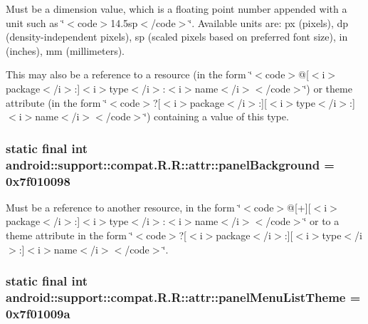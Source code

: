 Must be a dimension value, which is a floating point number appended with a unit such as \char`\"{}$<$code$>$14.5sp$<$/code$>$\char`\"{}. Available units are: px (pixels), dp (density-independent pixels), sp (scaled pixels based on preferred font size), in (inches), mm (millimeters). 

This may also be a reference to a resource (in the form \char`\"{}$<$code$>$@\mbox{[}$<$i$>$package$<$/i$>$:\mbox{]}$<$i$>$type$<$/i$>$:$<$i$>$name$<$/i$>$$<$/code$>$\char`\"{}) or theme attribute (in the form \char`\"{}$<$code$>$?\mbox{[}$<$i$>$package$<$/i$>$:\mbox{]}\mbox{[}$<$i$>$type$<$/i$>$:\mbox{]}$<$i$>$name$<$/i$>$$<$/code$>$\char`\"{}) containing a value of this type. \hypertarget{classandroid_1_1support_1_1compat_1_1_r_1_1attr_3a4db94ab04db4f145b93bf9cec3c151}{
\subsubsection[{panelBackground}]{\setlength{\rightskip}{0pt plus 5cm}static final int android::support::compat.R.R::attr::panelBackground = 0x7f010098}}
\label{classandroid_1_1support_1_1compat_1_1_r_1_1attr_3a4db94ab04db4f145b93bf9cec3c151}


Must be a reference to another resource, in the form \char`\"{}$<$code$>$@\mbox{[}+\mbox{]}\mbox{[}$<$i$>$package$<$/i$>$:\mbox{]}$<$i$>$type$<$/i$>$:$<$i$>$name$<$/i$>$$<$/code$>$\char`\"{} or to a theme attribute in the form \char`\"{}$<$code$>$?\mbox{[}$<$i$>$package$<$/i$>$:\mbox{]}\mbox{[}$<$i$>$type$<$/i$>$:\mbox{]}$<$i$>$name$<$/i$>$$<$/code$>$\char`\"{}. \hypertarget{classandroid_1_1support_1_1compat_1_1_r_1_1attr_5fb59485164822a5303986efd9629a67}{
\subsubsection[{panelMenuListTheme}]{\setlength{\rightskip}{0pt plus 5cm}static final int android::support::compat.R.R::attr::panelMenuListTheme = 0x7f01009a}}
\label{classandroid_1_1support_1_1compat_1_1_r_1_1attr_5fb59485164822a5303986efd9629a67}


